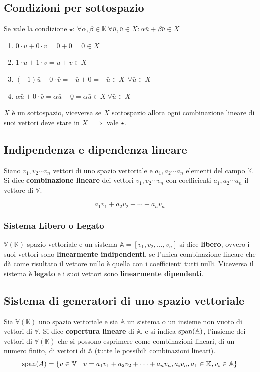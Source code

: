\documentclass[../main.tex]{subfiles}
\begin{document}
\subsection{Condizioni per sottospazio}

Se vale la condizione $\star$: $\forall\alpha,\beta\in\mathbb K \
    \forall\bar{u},\bar v\in X:\alpha\bar u+\beta\bar v\in X$
\begin{enumerate}
    \item $0\cdot\bar u + 0\cdot\bar v = \underline 0 + \underline 0 = \underline 0\in X$
    \item $1\cdot\bar u+1\cdot\bar v = \bar u+\bar v \in X$
    \item $(-1)\bar u + 0 \cdot\bar v = -\bar u +\underline 0 = -\bar u \in X \ \ \forall\bar u\in X$
    \item $\alpha\bar u+0\cdot\bar v=\alpha\bar u+\underline 0 = \alpha\bar u\in X \ \forall\bar u \in X$
\end{enumerate}
$X$ è un sottospazio, viceversa se $X$ sottospazio allora ogni combinazione lineare di suoi vettori deve stare in $X$ $\implies$ vale $\star$.

\subsection{Indipendenza e dipendenza lineare}
Siano $v_1, v_2\cdots v_n$ vettori di uno spazio vettoriale e $a_1, a_2\cdots
    a_n$ elementi del campo $\mathbb{K}$. Si dice \textbf{combinazione lineare} dei
vettori $v_1, v_2 \cdots v_n$ con coefficienti $a_1, a_2\cdots a_n$ il vettore
di $\mathbb V$.

\[a_1v_1+a_2v_2+\cdots+a_n v_n\]

\subsubsection{Sistema Libero o Legato}
$\mathbb V(\mathbb K)$ spazio vettoriale e un sistema $\mathbb A=[v_1, v_2,\ldots,v_n]$ si dice \textbf{libero}, ovvero i suoi vettori sono \textbf{linearmente indipendenti}, se l'unica combinazione lineare che dà come risultato il vettore nullo è quella con i coefficienti tutti nulli. Viceversa il sistema è \textbf{legato} e i suoi vettori sono \textbf{linearmente dipendenti}.

\subsection{Sistema di generatori di uno spazio vettoriale}
Sia $\mathbb V(\mathbb K)$ uno spazio vettoriale e sia $\mathbb A$ un sistema o
un insieme non vuoto di vettori di $\mathbb V$. Si dice \textbf{copertura
    lineare} di $\mathbb A$, e si indica $\operatorname{span}(\mathbb A)$, l'insieme dei vettori
di $\mathbb V(\mathbb K)$ che si possono esprimere come combinazioni lineari,
di un numero finito, di vettori di $\mathbb A$ (tutte le possibili combinazioni
lineari).
\[
    \operatorname{span}(A) = \{v\in\mathbb V \ | \ v = a_1v_1+a_2v_2+\cdots+a_n v_n,a_i v_n,a_1\in\mathbb K,v_i\in\mathbb A\}
\]
\end{document}
